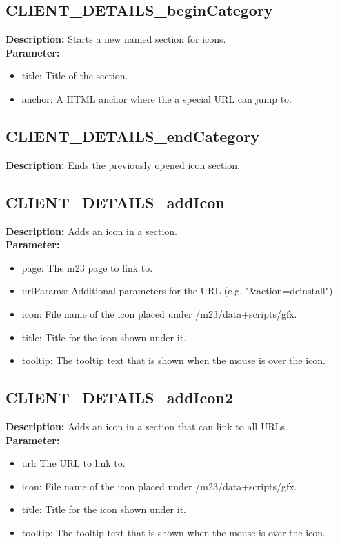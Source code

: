 \subsection{CLIENT\_DETAILS\_beginCategory}
\textbf{Description:} Starts a new named section for icons.\\
\textbf{Parameter:}
\begin{itemize}
\item title: Title of the section.
\item anchor: A HTML anchor where the a special URL can jump to.
\end{itemize}

\subsection{CLIENT\_DETAILS\_endCategory}
\textbf{Description:} Ends the previously opened icon section.\\

\subsection{CLIENT\_DETAILS\_addIcon}
\textbf{Description:} Adds an icon in a section.\\
\textbf{Parameter:}
\begin{itemize}
\item page: The m23 page to link to.
\item urlParams: Additional parameters for the URL (e.g. "\&action=deinstall").
\item icon: File name of the icon placed under /m23/data+scripts/gfx.
\item title: Title for the icon shown under it.
\item tooltip: The tooltip text that is shown when the mouse is over the icon.
\end{itemize}

\subsection{CLIENT\_DETAILS\_addIcon2}
\textbf{Description:} Adds an icon in a section that can link to all URLs.\\
\textbf{Parameter:}
\begin{itemize}
\item url: The URL to link to.
\item icon: File name of the icon placed under /m23/data+scripts/gfx.
\item title: Title for the icon shown under it.
\item tooltip: The tooltip text that is shown when the mouse is over the icon.
\end{itemize}

